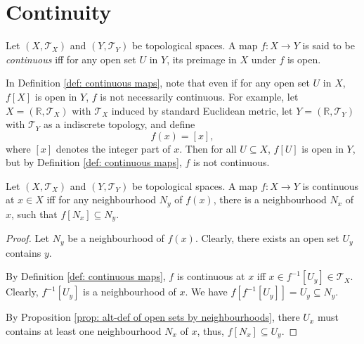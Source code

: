 \section{Continuity}

\begin{definition}
	\label{def: continuous maps}
	Let $(X, \mathcal T_X)$ and $(Y, \mathcal T_Y)$ be topological spaces. A map $f: X \to Y$ is said to be \textit{continuous} iff for any open set $U$ in $Y$, its preimage in $X$ under $f$ is open.
\end{definition}


\begin{note}
	In Definition \ref{def: continuous maps}, note that even if for any open set $U$ in $X$, $f[X]$ is open in $Y$, $f$ is not necessarily continuous. For example, let $X = (\mathbb R, \mathcal T_X)$ with $\mathcal T_X$ induced by standard Euclidean metric, let $Y=(\mathbb R, \mathcal T_Y)$ with $\mathcal T_Y$ as a indiscrete topology, and define
	$$
	f(x) = [x],
	$$
	where $[x]$ denotes the integer part of $x$. Then for all $U \subseteq X$, $f[U]$ is open in $Y$, but by Definition \ref{def: continuous maps}, $f$ is not continuous.
\end{note}


\begin{proposition}
	\label{prop: alt-def of continuous maps by neighbourhoods}
	Let $(X, \mathcal T_X)$ and $(Y, \mathcal T_Y)$ be topological spaces. A map $f: X \to Y$ is continuous at $x \in X$ iff for any neighbourhood $N_y$ of $f(x)$, there is a neighbourhood $N_x$ of $x$, such that $f[N_x] \subseteq N_y$.
	
	\begin{proof}
		Let $N_y$ be a neighbourhood of $f(x)$. Clearly, there exists an open set $U_y$ contains $y$.
	
		By Definition \ref{def: continuous maps}, $f$ is continuous at $x$ iff $x \in f^{-1}[U_y] \in \mathcal T_X$. Clearly, $f^{-1}[U_y]$ is a neighbourhood of $x$. We have $f[f^{-1}[U_y]] = U_y \subseteq N_y$.
		
		By Proposition \ref{prop: alt-def of open sets by neighbourhoods}, there $U_x$ must contains at least one neighbourhood $N_x$ of $x$, thus, $f[N_x] \subseteq U_y$.
	\end{proof}
\end{proposition}


